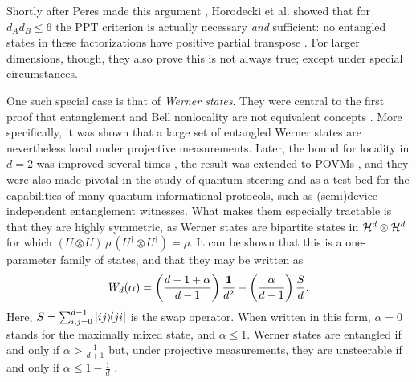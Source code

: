 		Shortly after Peres made this argument \cite{peres_1996_ppt}, Horodecki et al. showed that for $d_A d_B \leq 6$ the PPT criterion is actually necessary \emph{and} sufficient: no entangled states in these factorizations have positive partial transpose \cite{horodecki_1996_ppt}. For larger dimensions, though, they also prove this is not always true; except under special circumstances.
	
		One such special case is that of \emph{Werner states}. They were central to the first proof that entanglement and Bell nonlocality are not equivalent concepts \cite{werner_1989}. More specifically, it was shown that a large set of entangled Werner states are nevertheless local under projective measurements. Later, the bound for locality in $d=2$ was improved several times \cite{acin_2006_grothendieck,vertesi_2008_moreefficient,hirsch_2017_betterlocalhidden}, the result was extended to POVMs \cite{barrett_2002_povmslocality}, and they were also made pivotal in the study of quantum steering \cite{wiseman_2007_steering} and as a test bed for the capabilities of many quantum informational protocols, such as (semi)device-independent entanglement witnesses. What makes them especially tractable is that they are highly symmetric, as Werner states are bipartite states in $\mathcal{H}^{d} \otimes \mathcal{H}^{d}$ for which $(U \otimes U) \,\rho\, (U^\dagger \otimes U^\dagger) = \rho$. It can be shown that this is a one-parameter family of states, and that they may be written as
		$$
			W_d(\alpha) = \left( \frac{d-1+\alpha}{d-1} \right) \frac{\mathbf{1}}{d^2} - \left( \frac{\alpha}{d-1} \right) \frac{S}{d} .
		$$
		Here, $S = \sum_{i,j=0}^{d-1} \ketbra{ij}{ji}$ is the swap operator. When written in this form, $\alpha = 0$ stands for the maximally mixed state, and $\alpha \leq 1$. Werner states are entangled if and only if $\alpha > \frac{1}{d+1}$ but, under projective measurements, they are unsteerable if and only if $\alpha \leq 1 - \frac{1}{d}$ \cite{wiseman_2007_steering}. 
	
